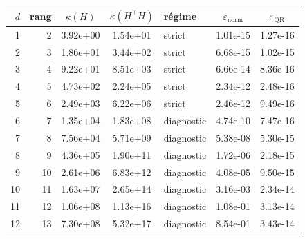 \begin{tabular}{r r S[table-format=1.2e-2] S[table-format=1.2e-2] l S[table-format=1.2e-2] S[table-format=1.2e-2]}
\toprule
{\(d\)} & {rang} & {\(\kappa(H)\)} & {\(\kappa(H^{\top}H)\)} & {r\'egime} & {\(\varepsilon_{\mathrm{norm}}\)} & {\(\varepsilon_{\mathrm{QR}}\)} \\
 & 2 & 3.92e+00 & 1.54e+01 & strict & 1.01e-15 & 1.27e-16 \\
2 & 3 & 1.86e+01 & 3.44e+02 & strict & 6.68e-15 & 1.02e-15 \\
3 & 4 & 9.22e+01 & 8.51e+03 & strict & 6.66e-14 & 8.36e-16 \\
4 & 5 & 4.73e+02 & 2.24e+05 & strict & 2.34e-12 & 2.48e-16 \\
5 & 6 & 2.49e+03 & 6.22e+06 & strict & 2.46e-12 & 9.49e-16 \\
6 & 7 & 1.35e+04 & 1.83e+08 & diagnostic & 4.74e-10 & 7.47e-16 \\
7 & 8 & 7.56e+04 & 5.71e+09 & diagnostic & 5.38e-08 & 5.30e-15 \\
8 & 9 & 4.36e+05 & 1.90e+11 & diagnostic & 1.72e-06 & 2.18e-15 \\
9 & 10 & 2.61e+06 & 6.83e+12 & diagnostic & 4.08e-05 & 9.50e-15 \\
10 & 11 & 1.63e+07 & 2.65e+14 & diagnostic & 3.16e-03 & 2.34e-14 \\
11 & 12 & 1.06e+08 & 1.13e+16 & diagnostic & 1.08e-01 & 3.13e-14 \\
12 & 13 & 7.30e+08 & 5.32e+17 & diagnostic & 8.54e-01 & 3.43e-14 \\
\bottomrule
\end{tabular}
